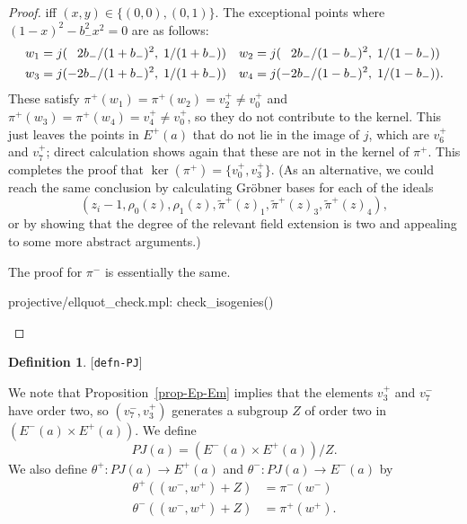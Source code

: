 \documentclass[reqno]{amsart}
\newcommand{\lbl}[1]{\label{#1}\textup{[\texttt{#1}]}\par}
\newcommand{\lbl}{\label}
\newcommand{\tht}       {\theta}
\newcommand{\tm}        {\times}
\newcommand{\tpi}	{\widetilde{\pi}}
\newcommand{\pp}        {\hphantom{+}}
\renewcommand{\:}{\colon}
\theoremstyle{definition}
\newtheorem{definition}[theorem]{Definition}
\begin{document}
\begin{proof}
 iff $(x,y)\in\{(0,0),(0,1)\}$.  The exceptional points where
 $(1-x)^2-b_-^2x^2=0$ are as follows:
 \begin{align*}
  w_1 &= j(\pp 2b_-/(1+b_-)^2,\;1/(1+b_-)) &
  w_2 &= j(\pp 2b_-/(1-b_-)^2,\;1/(1-b_-)) \\
  w_3 &= j(  - 2b_-/(1+b_-)^2,\;1/(1+b_-)) &
  w_4 &= j(  - 2b_-/(1-b_-)^2,\;1/(1-b_-)).
 \end{align*}
 These satisfy $\pi^+(w_1)=\pi^+(w_2)=v_2^+\neq v_0^+$ and
 $\pi^+(w_3)=\pi^+(w_4)=v_4^+\neq v_0^+$, so they do not contribute to
 the kernel.  This just leaves the points in $E^+(a)$ that do not lie
 in the image of $j$, which are $v_6^+$ and $v_7^+$; direct
 calculation shows again that these are not in the kernel of $\pi^+$.
 This completes the proof that $\ker(\pi^+)=\{v_0^+,v_3^+\}$.  (As an
 alternative, we could reach the same conclusion by calculating
 Gr\"obner bases for each of the ideals
 \[ (z_i-1,\rho_0(z),\rho_1(z),\tpi^+(z)_1,\tpi^+(z)_3,\tpi^+(z)_4),
 \]
 or by showing that the degree of the relevant field extension is two
 and appealing to some more abstract arguments.)

 The proof for $\pi^-$ is essentially the same.
 \begin{checks}
  projective/ellquot_check.mpl: check_isogenies()
 \end{checks}
\end{proof}

\begin{definition}\lbl{defn-PJ}
 We note that Proposition~\ref{prop-Ep-Em} implies that the elements
 $v_3^+$ and $v_7^-$ have order two, so $(v_7^-,v_3^+)$ generates
 a subgroup $Z$ of order two in $(E^-(a)\tm E^+(a))$.  We define
 \[ PJ(a) = (E^-(a)\tm E^+(a))/Z. \]
 We also define $\tht^+\:PJ(a)\to E^+(a)$ and
 $\tht^-\:PJ(a)\to E^-(a)$ by
 \begin{align*}
  \tht^+((w^-,w^+)+Z) &= \pi^-(w^-) \\
  \tht^-((w^-,w^+)+Z) &= \pi^+(w^+).
 \end{align*}
\end{definition}
\end{document}
